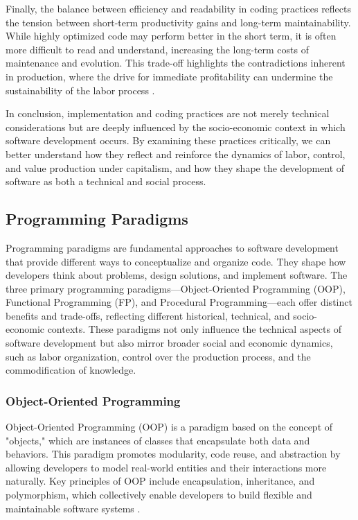 \begin{refsection}
Finally, the balance between efficiency and readability in coding practices reflects the tension between short-term productivity gains and long-term maintainability. While highly optimized code may perform better in the short term, it is often more difficult to read and understand, increasing the long-term costs of maintenance and evolution. This trade-off highlights the contradictions inherent in production, where the drive for immediate profitability can undermine the sustainability of the labor process \cite[pp.~78-81]{Pressman2019}.

In conclusion, implementation and coding practices are not merely technical considerations but are deeply influenced by the socio-economic context in which software development occurs. By examining these practices critically, we can better understand how they reflect and reinforce the dynamics of labor, control, and value production under capitalism, and how they shape the development of software as both a technical and social process.

\subsection{Programming Paradigms}

Programming paradigms are fundamental approaches to software development that provide different ways to conceptualize and organize code. They shape how developers think about problems, design solutions, and implement software. The three primary programming paradigms—Object-Oriented Programming (OOP), Functional Programming (FP), and Procedural Programming—each offer distinct benefits and trade-offs, reflecting different historical, technical, and socio-economic contexts. These paradigms not only influence the technical aspects of software development but also mirror broader social and economic dynamics, such as labor organization, control over the production process, and the commodification of knowledge.

\subsubsection{Object-Oriented Programming}

Object-Oriented Programming (OOP) is a paradigm based on the concept of "objects," which are instances of classes that encapsulate both data and behaviors. This paradigm promotes modularity, code reuse, and abstraction by allowing developers to model real-world entities and their interactions more naturally. Key principles of OOP include encapsulation, inheritance, and polymorphism, which collectively enable developers to build flexible and maintainable software systems \cite[pp.~102-105]{Larman2008}.


\end{refsection}
